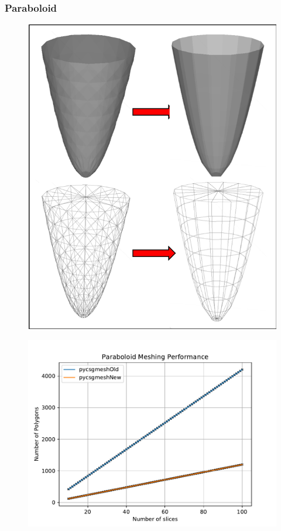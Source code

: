 \documentclass[12pt,a4paper]{article}
\begin{document}
\subsubsection{Paraboloid}

\begin{figure}[h!]
\centering
\begin{minipage}{.2\textwidth}
  \centering
  \includegraphics[height=1\linewidth]{Images//Meshes//paraboloid.png}
  \label{fig:test1}
\end{minipage}%
\begin{minipage}{.3\textwidth}
  \centering
  \includegraphics[scale=0.35]{Images//Quad_fits//Paraboloid_quad.pdf}
  \label{fig:test2}
\end{minipage}%
\end{figure}
\end{document}
